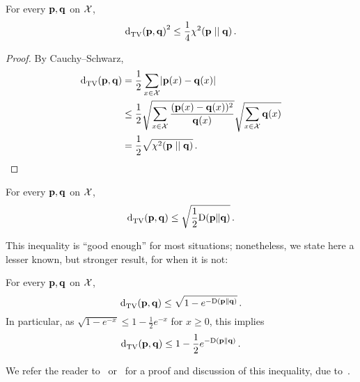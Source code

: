 \tbc
{}

\begin{lemma}
  \label{app:distances:chi2:tv}
For every $\mathbf{p},\mathbf{q}$ on $\mathcal{X}$, 
  \[
    \totalvardist{\p}{\q}^2 \leq \frac{1}{4}\chisquare{\p}{\q}\,.
  \]
\end{lemma}
\begin{proof}
  By Cauchy--Schwarz, 
  \begin{align*}
      \totalvardist{\p}{\q} &= \frac{1}{2}\sum_{x\in\domain} \abs{\p(x)-\q(x)} \\
      &\leq \frac{1}{2}\sqrt{\sum_{x\in\domain} \frac{(\p(x)-\q(x))^2}{\q(x)}}\sqrt{\sum_{x\in\domain} \q(x)} \\
      &= \frac{1}{2}\sqrt{\chisquare{\p}{\q}}\,.
  \end{align*}
\end{proof}

\begin{lemma}
  \label{app:distances:pinsker}
For every $\mathbf{p},\mathbf{q}$ on $\mathcal{X}$, 
\[
  \totalvardist{\p}{\q} \leq \sqrt{\frac{1}{2}\kldiv{\p}{\q}}\,.
\]
\end{lemma}
This inequality is ``good enough'' for most situations; nonetheless, we state here a lesser known, but stronger result, for when it is not:
\begin{lemma}
  \label{app:distances:bh}
For every $\mathbf{p},\mathbf{q}$ on $\mathcal{X}$, 
\begin{equation}
  \label{eq:bh}
  \totalvardist{\p}{\q} \leq \sqrt{1-e^{-\kldiv{\p}{\q}}}\,.
\end{equation}
In particular, as $\sqrt{1-e^{-x}} \leq 1-\frac{1}{2}e^{-x}$ for $x\geq 0$, this implies
\begin{equation}
  \label{eq:tsybakov}
  \totalvardist{\p}{\q} \leq 1-\frac{1}{2}e^{-\kldiv{\p}{\q}}\,.
\end{equation}
\end{lemma}
We refer the reader to~\citet{Canonne:note:22} or~\citet[Section~2.4.1]{Tsybakov09} for a proof and discussion of this inequality, due to~\citet{BretagnolleH78}.

